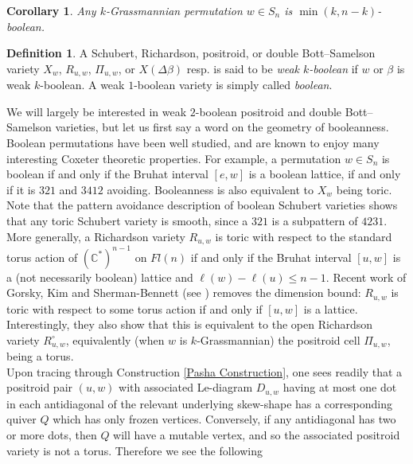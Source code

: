 \documentclass[11pt]{amsart}
\newtheorem{cor}[thm]{Corollary}
\theoremstyle{definition}
\newtheorem{defn}[thm]{Definition}
\theoremstyle{remark}
\numberwithin{equation}{section}
\begin{document}
\begin{cor}
    Any $k$-Grassmannian permutation $w \in S_n$ is $\min(k, n-k)$-boolean.
\end{cor}

\begin{defn}
    A Schubert, Richardson, positroid, or double Bott--Samelson variety $X_w$, $R_{u,w}$, $\Pi_{u,w}$, or $X(\Delta \beta)$ resp. is said to be \textit{weak $k$-boolean} if $w$ or $\beta$ is weak $k$-boolean. A weak $1$-boolean variety is simply called \textit{boolean}.
\end{defn}

We will largely be interested in weak $2$-boolean positroid and double Bott--Samelson varieties, but let us first say a word on the geometry of booleanness.\\

Boolean permutations have been well studied, and are known to enjoy many interesting Coxeter theoretic properties. For example, a permutation $w \in S_n$ is boolean if and only if the Bruhat interval $[e, w]$ is a boolean lattice, if and only if it is $321$ and $3412$ avoiding. Booleanness is also equivalent to $X_w$ being toric. Note that the pattern avoidance description of boolean Schubert varieties shows that any toric Schubert variety is smooth, since a $321$ is a subpattern of $4231$.\\

More generally, a Richardson variety $R_{u,w}$ is toric with respect to the standard torus action of $(\mathbb{C}^*)^{n-1}$ on $Fl(n)$ if and only if the Bruhat interval $[u,w]$ is a (not necessarily boolean) lattice and $\ell(w) - \ell(u) \le n-1$. Recent work of Gorsky, Kim and Sherman-Bennett (see \cite{GKSB}) removes the dimension bound: $R_{u,w}$ is toric with respect to some torus action if and only if $[u,w]$ is a lattice. Interestingly, they also show that this is equivalent to the open Richardson variety $R^\circ_{u,w}$, equivalently (when $w$ is $k$-Grassmannian) the positroid cell $\Pi_{u,w}$, being a torus.\\

Upon tracing through Construction \ref{Pasha Construction}, one sees readily that a positroid pair $(u, w)$ with associated Le-diagram $D_{u,w}$ having at most one dot in each antidiagonal of the relevant underlying skew-shape has a corresponding quiver $Q$ which has only frozen vertices. Conversely, if any antidiagonal has two or more dots, then $Q$ will have a mutable vertex, and so the associated positroid variety is not a torus. Therefore we see the following
\end{document}
